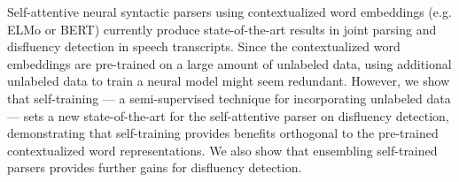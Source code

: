 Self-attentive neural syntactic parsers using contextualized word embeddings (e.g. ELMo or BERT) currently produce state-of-the-art results in joint parsing and disfluency detection in speech transcripts. Since the contextualized word embeddings are pre-trained on a large amount of unlabeled data, using additional unlabeled data to train a neural model might seem redundant. However, we show that self-training --- a semi-supervised technique for incorporating unlabeled data --- sets a new state-of-the-art for the self-attentive parser on disfluency detection, demonstrating that self-training provides benefits orthogonal to the pre-trained contextualized word representations. We also show that ensembling self-trained parsers provides further gains for disfluency detection.
